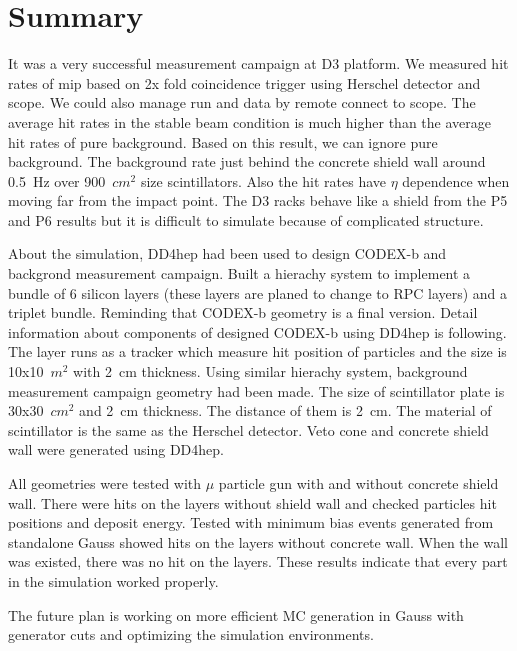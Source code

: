 \section{Summary}
\label{sec:Summary}

It was a very successful measurement campaign at D3 platform. 
We measured hit rates of mip based on 2x fold coincidence trigger using Herschel detector and scope.
We could also manage run and data by remote connect to scope.
The average hit rates in the stable beam condition is much higher than the average hit rates of pure background.
Based on this result, we can ignore pure background.
The background rate just behind the concrete shield wall around 0.5~Hz over 900~$cm^{2}$ size scintillators.
Also the hit rates have $\eta$ dependence when moving far from the impact point.
The D3 racks behave like a shield from the P5 and P6 results but it is difficult to simulate because of complicated structure.

About the simulation, DD4hep had been used to design CODEX-b and backgrond measurement campaign.
Built a hierachy system to implement a bundle of 6 silicon layers (these layers are planed to change to RPC layers) and a triplet bundle.
Reminding that CODEX-b geometry is a final version. 
Detail information about components of designed CODEX-b using DD4hep is following. 
The layer runs as a tracker which measure hit position of particles and the size is 10x10~$m^{2}$ with 2~cm thickness.
Using similar hierachy system, background measurement campaign geometry had been made.
The size of scintillator plate is 30x30~$cm^{2}$ and 2~cm thickness.
The distance of them is 2~cm.
The material of scintillator is the same as the Herschel detector.
Veto cone and concrete shield wall were generated using DD4hep.

All geometries were tested with $\mu$ particle gun with and without concrete shield wall.
There were hits on the layers without shield wall and checked particles hit positions and deposit energy.
Tested with minimum bias events generated from standalone Gauss showed hits on the layers without concrete wall.
When the wall was existed, there was no hit on the layers.
These results indicate that every part in the simulation worked properly.

The future plan is working on more efficient MC generation in Gauss with generator cuts and optimizing the simulation environments.





